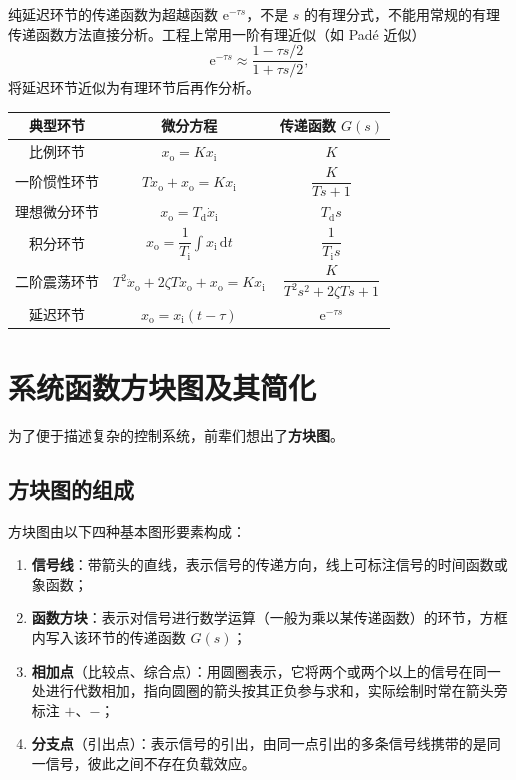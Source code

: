 \begin{remark}
    纯延迟环节的传递函数为超越函数 $\mathrm{e}^{-\tau s}$，不是 $s$ 的有理分式，不能用常规的有理传递函数方法直接分析。工程上常用一阶有理近似（如 Pad\'e 近似）
    \[
    \mathrm{e}^{-\tau s}\approx\frac{1-\tau s/2}{1+\tau s/2},
    \]
    将延迟环节近似为有理环节后再作分析。
\end{remark}

\begin{keybox}[典型环节传递函数汇总]
    \centering
    \begin{tabular}{c c c}
        \hline
        典型环节 & 微分方程 & 传递函数 $G(s)$ \\
        \hline
        比例环节 & $x_{\mathrm{o}}=Kx_{\mathrm{i}}$ & $K$ \\
        一阶惯性环节 & $T\dot{x}_{\mathrm{o}}+x_{\mathrm{o}}=Kx_{\mathrm{i}}$ & $\dfrac{K}{Ts+1}$ \\
        理想微分环节 & $x_{\mathrm{o}}=T_{\mathrm{d}}\dot{x}_{\mathrm{i}}$ & $T_{\mathrm{d}}s$ \\
        积分环节 & $x_{\mathrm{o}}=\dfrac{1}{T_{\mathrm{i}}}\displaystyle\int x_{\mathrm{i}}\,\mathrm{d}t$ & $\dfrac{1}{T_{\mathrm{i}}s}$ \\
        二阶震荡环节 & $T^{2}\ddot{x}_{\mathrm{o}}+2\zeta T\dot{x}_{\mathrm{o}}+x_{\mathrm{o}}=Kx_{\mathrm{i}}$ & $\dfrac{K}{T^{2}s^{2}+2\zeta Ts+1}$ \\
        延迟环节 & $x_{\mathrm{o}}=x_{\mathrm{i}}(t-\tau)$ & $\mathrm{e}^{-\tau s}$ \\
        \hline
    \end{tabular}
\end{keybox}
\section{系统函数方块图及其简化}
\label{sec:系统函数方块图及其简化}
为了便于描述复杂的控制系统，前辈们想出了\textbf{方块图}。

\subsection{方块图的组成}

方块图由以下四种基本图形要素构成：
\begin{enumerate}
    \item \textbf{信号线}：带箭头的直线，表示信号的传递方向，线上可标注信号的时间函数或象函数；
    \item \textbf{函数方块}：表示对信号进行数学运算（一般为乘以某传递函数）的环节，方框内写入该环节的传递函数 $G(s)$；
    \item \textbf{相加点}（比较点、综合点）：用圆圈表示，它将两个或两个以上的信号在同一处进行代数相加，指向圆圈的箭头按其正负参与求和，实际绘制时常在箭头旁标注 $+$、$-$；
    \item \textbf{分支点}（引出点）：表示信号的引出，由同一点引出的多条信号线携带的是同一信号，彼此之间不存在负载效应。
\end{enumerate}

